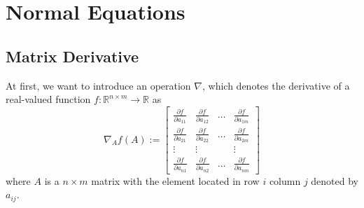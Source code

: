 \section{Normal Equations}

\subsection{Matrix Derivative}
At first, we want to introduce an operation $\nabla $, which denotes the derivative of a real-valued function $f: \mathbb{R}^{n\times m} \rightarrow \mathbb{R}$ as 
\[\nabla_A f(A) := \left[
\begin{array}{cccc}
    \frac{\partial f}{\partial a_{11}} & \frac{\partial f}{\partial a_{12}} & \ldots & \frac{\partial f}{\partial a_{1m}}\\
    \frac{\partial f}{\partial a_{21}} & \frac{\partial f}{\partial a_{22}} & \ldots & \frac{\partial f}{\partial a_{2m}}\\
    \vdots & \vdots & & \vdots\\
    \frac{\partial f}{\partial a_{n1}} & \frac{\partial f}{\partial a_{n2}} & \ldots & \frac{\partial f}{\partial a_{nm}}
\end{array}\right]
\]
where $A$ is a $n \times m$ matrix with the element located in row $i$ column $j$ denoted by $a_{ij}$.



 